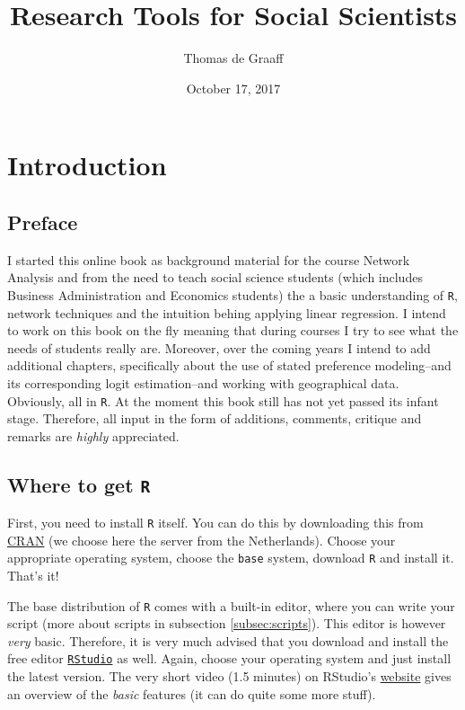 \documentclass[]{article}
\title{Research Tools for Social Scientists}
\author{Thomas de Graaff}
\date{October 17, 2017}
\theoremstyle{definition}
\theoremstyle{definition}
\theoremstyle{definition}
\theoremstyle{remark}
\begin{document}
\maketitle

{
\setcounter{tocdepth}{2}
\tableofcontents
}
\section{Introduction}\label{introduction}

\subsection{Preface}\label{preface}

I started this online book as background material for the course Network
Analysis and from the need to teach social science students (which
includes Business Administration and Economics students) the a basic
understanding of \texttt{R}, network techniques and the intuition behing
applying linear regression. I intend to work on this book on the fly
meaning that during courses I try to see what the needs of students
really are. Moreover, over the coming years I intend to add additional
chapters, specifically about the use of stated preference modeling--and
its corresponding logit estimation--and working with geographical data.
Obviously, all in \texttt{R}. At the moment this book still has not yet
passed its infant stage. Therefore, all input in the form of additions,
comments, critique and remarks are \emph{highly} appreciated.

\subsection{\texorpdfstring{Where to get
\texttt{R}}{Where to get R}}\label{where-to-get-r}

First, you need to install \texttt{R} itself. You can do this by
downloading this from \href{http://cran.xl-mirror.nl/}{CRAN} (we choose
here the server from the Netherlands). Choose your appropriate operating
system, choose the \texttt{base} system, download \texttt{R} and install
it. That's it!

The base distribution of \texttt{R} comes with a built-in editor, where
you can write your script (more about scripts in subsection
\ref{subsec:scripts}). This editor is however \emph{very} basic.
Therefore, it is very much advised that you download and install the
free editor
\href{https://www.rstudio.com/products/rstudio/download/}{\texttt{RStudio}}
as well. Again, choose your operating system and just install the latest
version. The very short video (1.5 minutes) on RStudio's
\href{https://www.rstudio.com/products/rstudio/}{website} gives an
overview of the \emph{basic} features (it can do quite some more stuff).
\end{document}
